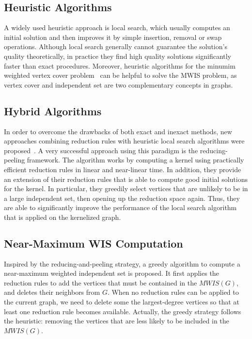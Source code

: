 \documentclass[sigconf, nonacm]{acmart}
\begin{document}
\subsection{Heuristic Algorithms}

A widely used heuristic approach is local search, which usually computes an initial solution and then improves it by simple insertion, removal or swap operations. Although local search generally cannot guarantee the solution’s quality theoretically, in practice they find high quality solutions significantly faster than exact procedures. Moreover, heuristic algorithms for the minumim weighted vertex cover problem~\cite{2018Improving,2017An} can be helpful to solve the MWIS problem, as vertex cover and independent set are two complementary concepts in graphs.

\subsection{Hybrid Algorithms}

In order to overcome the drawbacks of both exact and inexact methods, new approaches combining reduction rules with heuristic local search algorithms were proposed~\cite{Lamm0SWZ19}. A very successful approach using this paradigm is the reducing-peeling framework. The algorithm works by computing a kernel using practically efficient reduction rules in linear and near-linear time. In addition, they provide an extension of their reduction rules that is able to compute good initial solutions for the kernel. In particular, they greedily select vertices that are unlikely to be in a large independent set, then opening up the reduction space again. Thus, they are able to significantly improve the performance of the local search algorithm that is applied on the kernelized graph.

\subsection{Near-Maximum WIS Computation}

Inspired by the reducing-and-peeling strategy, a greedy algorithm to compute a near-maximum weighted independent set is proposed. It first applies the reduction rules to add the vertices that must be contained in the $MWIS(G)$, and deletes their neighbors from $G$. When no reduction rules can be applied to the current graph, we need to delete some the largest-degree vertices so that at least one reduction rule becomes available. Actually, the greedy strategy follows the heuristic: removing the vertices that are less likely to be included in the $MWIS(G)$.
\end{document}
